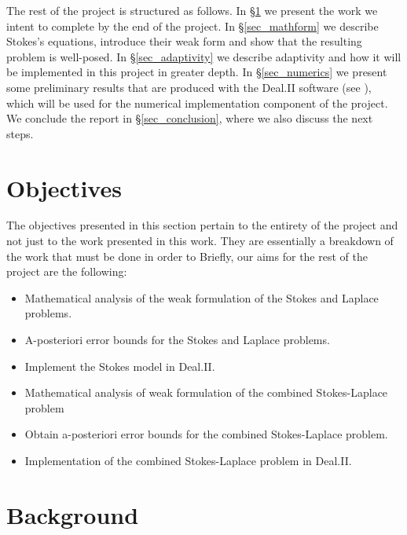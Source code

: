 \documentclass[12pt,a4paper]{article}
\theoremstyle{definition}
\begin{document}
The rest of the project is structured as follows.  In \S \ref{sec_obj} we present the work we intent to complete by the end of the project.  In \S \ref{sec_mathform} we describe Stokes's equations, introduce their weak form and show that the resulting problem is well-posed.  In \S \ref{sec_adaptivity} we  describe adaptivity and how it will be implemented in this project in greater depth.  In \S \ref{sec_numerics} we present some preliminary results that are produced with the Deal.II software (see \cite{BangerthHartmannKanschat2007}), which  will be used for the numerical implementation component of the project.  We conclude the report in \S \ref{sec_conclusion}, where we also discuss the next steps.

\section{Objectives}\label{sec_obj}
The objectives presented in this section pertain to the entirety of the project and not just to the work presented in this work.  They are essentially a breakdown of the work that must be done in order to  Briefly, our aims for the rest of the project are the following:
\begin{itemize}
\item Mathematical analysis of the weak formulation of the Stokes and Laplace problems.
\item A-posteriori error bounds for the Stokes and Laplace problems.
\item Implement the Stokes model in Deal.II.
\item Mathematical analysis of weak formulation of the combined Stokes-Laplace problem
\item Obtain a-posteriori error bounds for the combined Stokes-Laplace problem.
\item Implementation of the combined Stokes-Laplace problem in Deal.II.
\end{itemize}


\section{Background}\label{literature_review}
\end{document}
